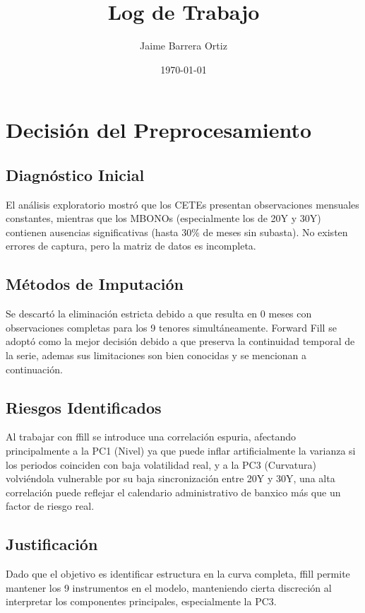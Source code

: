 \documentclass[11pt]{article}
\title{Log de Trabajo}
\author{Jaime Barrera Ortiz}
\date{\today}
\begin{document}
\maketitle

\section{Decisión del Preprocesamiento}


\subsection{Diagnóstico Inicial}

El análisis exploratorio mostró que los CETEs presentan observaciones mensuales constantes, mientras que los MBONOs (especialmente los de 20Y y 30Y) contienen ausencias significativas (hasta 30$\%$ de meses sin subasta). No existen errores de captura, pero la matriz de datos es incompleta.

\subsection{Métodos de Imputación}\label{subsec:metodos-imputacion}

Se descartó la eliminación estricta debido a que resulta en 0 meses con observaciones completas para los 9 tenores simultáneamente. Forward Fill se adoptó como la mejor decisión debido a que preserva la continuidad temporal de la serie, ademas sus limitaciones son bien conocidas y se mencionan a continuación.

\subsection{Riesgos Identificados}

Al trabajar con ffill se introduce una correlación espuria, afectando principalmente a la PC1 (Nivel) ya que puede inflar artificialmente la varianza si los periodos coinciden con baja volatilidad real, y a la PC3 (Curvatura) volviéndola vulnerable por su baja sincronización entre 20Y y 30Y, una alta correlación puede reflejar el calendario administrativo de banxico más que un factor de riesgo real.

\subsection{Justificación}

Dado que el objetivo es identificar estructura en la curva completa, ffill permite mantener los 9 instrumentos en el modelo, manteniendo cierta discreción al interpretar los componentes principales, especialmente la PC3.
\end{document}
